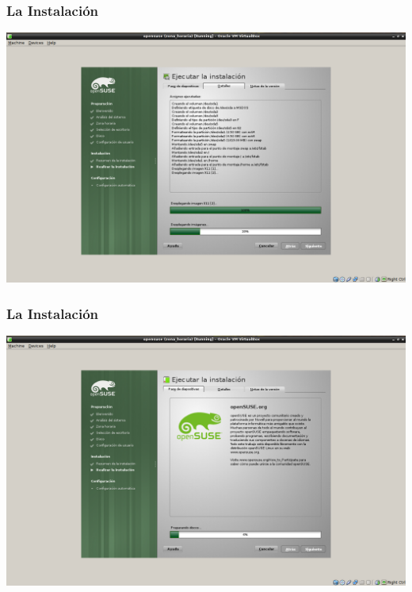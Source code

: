 \documentclass{beamer}
\begin{document}
\begin{frame}
\frametitle{La Instalaci\'on}
\includegraphics[height=0.8\textheight]{16_.png} \hspace*{7.3cm}
\end{frame} 
\begin{frame}
\frametitle{La Instalaci\'on}
\includegraphics[height=0.8\textheight]{17_.png} \hspace*{7.3cm}
\end{frame} 
\end{document}
